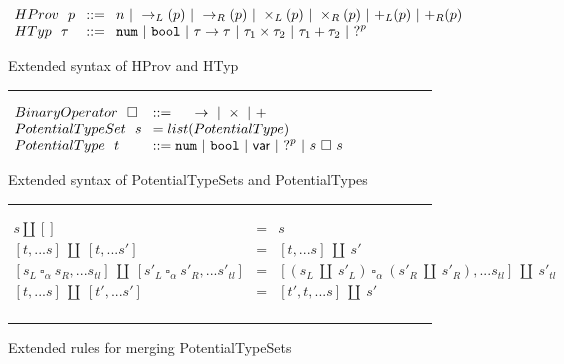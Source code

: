\begin{figure}[h!]
\centering
$\arraycolsep=4pt\begin{array}{lll}
HProv~~ p & ::= & 
    n ~\vert~ 
    \rightarrow_{L}(p) ~\vert~ 
    \rightarrow_{R}(p) ~\vert~ 
    \times_{L}(p) ~\vert~ 
    \times_{R}(p) ~\vert~ 
    \mathtt{+}_{L}(p) ~\vert~ 
    \mathtt{+}_{R}(p)
    \\
HTyp~~ \tau & ::= &
  \tnum ~\vert~
  \tbool ~\vert~
  \tarr{\tau}{\tau} ~\vert~
  \tau_1 \times \tau_2 ~\vert~
  \tau_1 + \tau_2 ~\vert~
  \tehole^p
  \\
\end{array}$
\label{fig:syntax_possible_type_sets}
\caption{Extended syntax of HProv and HTyp}
\hrule
$\arraycolsep=4pt\begin{array}{lll}
BinaryOperator~~ \square & ::=~~~~~
\rightarrow  ~\vert~ 
\times  ~\vert~ 
\mathtt{+}
\\
PotentialTypeSet~~ s & = list(PotentialType)
\\
PotentialType~~ t & ::= 
  \tnum ~\vert~
  \tbool ~\vert~
  \TVar ~\vert~
  \tehole^p ~\vert~
  s ~\square~ s
  \\
\end{array}$
\label{fig:syntax_possible_type_sets}
\caption{Extended syntax of PotentialTypeSets and PotentialTypes}
\vspace{5px}
\hrule
\[\begin{array}{rcl}
    s \amalg [] & = & s \\
    \left[t,...s\right] ~\amalg~ \left[t,...s'\right] & = & \left[t,...s\right] ~\amalg~ s' \\
    \left[s_L ~ \square_{\alpha} ~ s_R,...s_{tl}\right] ~\amalg~ \left[s'_L ~ \square_{\alpha} ~ s'_R,...s'_{tl}\right] & = & \left[(s_L ~\amalg~ s'_L) ~ \square_{\alpha} ~ (s'_R ~\amalg~ s'_R),...s_{tl}\right] ~\amalg~ s'_{tl} \\
    \left[t,...s\right] ~\amalg~ \left[t',...s'\right] & = & \left[t',t,...s\right] ~\amalg~ s' \\

\end{array}\] 
\caption{Extended rules for merging PotentialTypeSets}
\vspace{5px} 
\hrule
\label{fig:extended_merging_possible_type_sets}
\vspace{-5px}
\end{figure}
